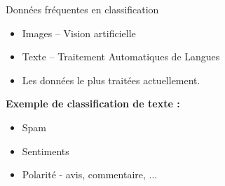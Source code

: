 \documentclass[aspectratio=169,xcolor=dvipsnames, t]{beamer}
\begin{document}
\begin{frame}{Données fréquentes en classification}
	\begin{itemize}
		\item Images -- Vision artificielle
		\item Texte -- Traitement Automatiques de Langues
		\item Les données le plus traitées actuellement.
	\end{itemize}
	\textbf{Exemple de classification de texte :}
	\begin{itemize}
		\item Spam
		\item Sentiments
		\item Polarité - avis, commentaire, ...
	\end{itemize}

\end{frame}
\end{document}
